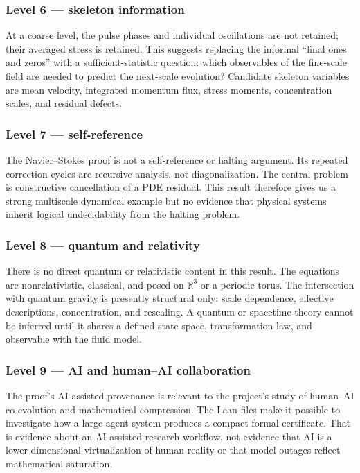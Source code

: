 \documentclass[11pt]{article}
\newcommand{\R}{\mathbb{R}}
\theoremstyle{definition}
\theoremstyle{plain}
\theoremstyle{remark}
\begin{document}
\subsubsection*{Level 6 --- skeleton information}

At a coarse level, the pulse phases and individual oscillations are not retained; their averaged stress is retained. This suggests replacing the informal ``final ones and zeros'' with a sufficient-statistic question: which observables of the fine-scale field are needed to predict the next-scale evolution? Candidate skeleton variables are mean velocity, integrated momentum flux, stress moments, concentration scales, and residual defects.

\subsubsection*{Level 7 --- self-reference}

The Navier--Stokes proof is not a self-reference or halting argument. Its repeated correction cycles are recursive analysis, not diagonalization. The central problem is constructive cancellation of a PDE residual. This result therefore gives us a strong multiscale dynamical example but no evidence that physical systems inherit logical undecidability from the halting problem.

\subsubsection*{Level 8 --- quantum and relativity}

There is no direct quantum or relativistic content in this result. The equations are nonrelativistic, classical, and posed on $\R^3$ or a periodic torus. The intersection with quantum gravity is presently structural only: scale dependence, effective descriptions, concentration, and rescaling. A quantum or spacetime theory cannot be inferred until it shares a defined state space, transformation law, and observable with the fluid model.

\subsubsection*{Level 9 --- AI and human--AI collaboration}

The proof's AI-assisted provenance is relevant to the project's study of human--AI co-evolution and mathematical compression. The Lean files make it possible to investigate how a large agent system produces a compact formal certificate. That is evidence about an AI-assisted research workflow, not evidence that AI is a lower-dimensional virtualization of human reality or that model outages reflect mathematical saturation.
\end{document}
